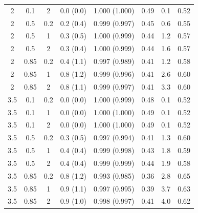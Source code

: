 \begin{table}[tp]
\begin{tabular}{@{}cccccccc@{}}
2 & 0.1 & 2 & 0.0 (0.0) & 1.000 (1.000) & 0.49 & 0.1 & 0.52 \\
2 & 0.5 & 0.2 & 0.2 (0.4) & 0.999 (0.997) & 0.45 & 0.6 & 0.55 \\
2 & 0.5 & 1 & 0.3 (0.5) & 1.000 (0.999) & 0.44 & 1.2 & 0.57 \\
2 & 0.5 & 2 & 0.3 (0.4) & 1.000 (0.999) & 0.44 & 1.6 & 0.57 \\
2 & 0.85 & 0.2 & 0.4 (1.1) & 0.997 (0.989) & 0.41 & 1.2 & 0.58 \\
2 & 0.85 & 1 & 0.8 (1.2) & 0.999 (0.996) & 0.41 & 2.6 & 0.60 \\
2 & 0.85 & 2 & 0.8 (1.1) & 0.999 (0.997) & 0.41 & 3.3 & 0.60 \\
3.5 & 0.1 & 0.2 & 0.0 (0.0) & 1.000 (0.999) & 0.48 & 0.1 & 0.52 \\
3.5 & 0.1 & 1 & 0.0 (0.0) & 1.000 (1.000) & 0.49 & 0.1 & 0.52 \\
3.5 & 0.1 & 2 & 0.0 (0.0) & 1.000 (1.000) & 0.49 & 0.1 & 0.52 \\
3.5 & 0.5 & 0.2 & 0.3 (0.5) & 0.997 (0.994) & 0.41 & 1.3 & 0.60 \\
3.5 & 0.5 & 1 & 0.4 (0.4) & 0.999 (0.998) & 0.43 & 1.8 & 0.59 \\
3.5 & 0.5 & 2 & 0.4 (0.4) & 0.999 (0.999) & 0.44 & 1.9 & 0.58 \\
3.5 & 0.85 & 0.2 & 0.8 (1.2) & 0.993 (0.985) & 0.36 & 2.8 & 0.65 \\
3.5 & 0.85 & 1 & 0.9 (1.1) & 0.997 (0.995) & 0.39 & 3.7 & 0.63 \\
3.5 & 0.85 & 2 & 0.9 (1.0) & 0.998 (0.997) & 0.41 & 4.0 & 0.62 \\
\bottomrule
\end{tabular}
\end{table}
